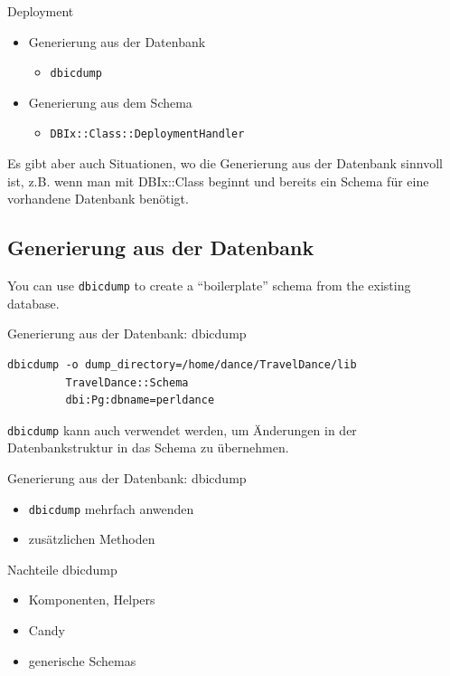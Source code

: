 \begin{frame}[fragile]{Deployment}
\begin{itemize}
\item Generierung aus der Datenbank
\begin{itemize}
\item \verb|dbicdump|
\end{itemize}
\item Generierung aus dem Schema
\begin{itemize}
\item \verb|DBIx::Class::DeploymentHandler|
\end{itemize}
\end{itemize}
\end{frame}

Es gibt aber auch Situationen, wo die
Generierung aus der Datenbank sinnvoll ist,
z.B. wenn man mit DBIx::Class beginnt und
bereits ein Schema für eine vorhandene
Datenbank benötigt.


\subsection{Generierung aus der Datenbank}

You can use \verb|dbicdump| to create a ``boilerplate'' schema from the
existing database.

\begin{frame}[fragile]{Generierung aus der Datenbank: dbicdump}
\begin{lstlisting}
dbicdump -o dump_directory=/home/dance/TravelDance/lib 
         TravelDance::Schema 
         dbi:Pg:dbname=perldance
\end{lstlisting}
\end{frame}

\verb|dbicdump| kann auch verwendet werden, um Änderungen in
der Datenbankstruktur in das Schema zu übernehmen.

\begin{frame}[fragile]{Generierung aus der Datenbank: dbicdump}
\begin{itemize}
\item \verb|dbicdump| mehrfach anwenden
\item zusätzlichen Methoden
\end{itemize}
\end{frame}

\begin{frame}[fragile]{Nachteile dbicdump}
\begin{itemize}
\item Komponenten, Helpers
\item Candy
\item generische Schemas
\end{itemize}
\end{frame}

